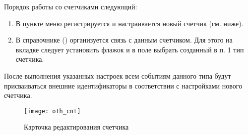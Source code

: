 Порядок работы со счетчиками следующий:
\begin{enumerate}
 \item В пункте меню  регистрируется и настраивается новый счетчик (см. ниже).
 \item В справочнике  () организуется связь с данным счетчиком. Для этого на вкладке  следует установить флажок  и в поле  выбрать созданный в п. 1 тип счетчика.
\end{enumerate}

После выполнения указанных настроек всем событиям данного типа будут присваиваться внешние идентификаторы в соответствии с настройками нового счетчика.

\begin{figure}[ht]\centering
 \texttt{[image: oth\_cnt]}
 \caption{Карточка редактирования счетчика}
 \label{img_oth_cnt}
\end{figure}

